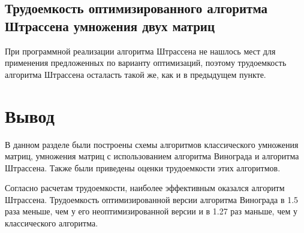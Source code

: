 \subsection{Трудоемкость оптимизированного алгоритма Штрассена умножения двух матриц}

При программной реализации алгоритма Штрассена не нашлось мест для применения предложенных по варианту оптимизаций, поэтому трудоемкость алгоритма Штрассена осталасть такой же, как и в предыдущем пункте.

\section*{Вывод}

В данном разделе были построены схемы алгоритмов классического умножения матриц, умножения матриц с использованием алгоритма Винограда и алгоритма Штрассена. Также были приведены оценки трудоемкости этих алгоритмов.

Согласно расчетам трудоемкости, наиболее эффективным оказался алгоритм Штрассена. Трудоемкость оптимизированной версии алгоритма Винограда в 1.5 раза меньше, чем у его неоптимизированной версии и в 1.27 раз маньше, чем у классического алгоритма. 

